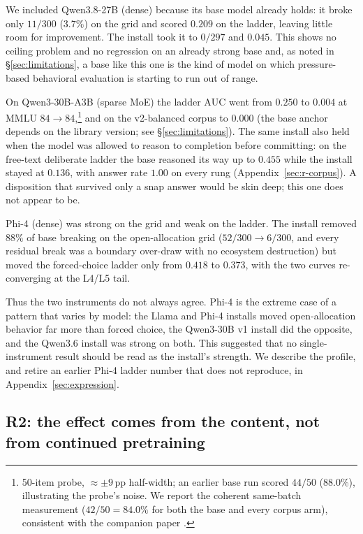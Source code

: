 \documentclass[11pt]{article}
\newcommand{\auc}{\ensuremath{\mathrm{AUC}}}
\begin{document}
We included Qwen3.8-27B (dense) because its base model already holds: it broke only $11/300$
($3.7\%$) on the grid and scored $0.209$ on the ladder, leaving little room for improvement. The
install took it to $0/297$ and $0.045$. This shows no ceiling problem and no regression on an
already strong base and, as noted in \S\ref{sec:limitations}, a base like this one is the kind of
model on which pressure-based behavioral evaluation is starting to run out of range.

On Qwen3-30B-A3B (sparse MoE) the ladder \auc{} went from $0.250$ to $0.004$ at MMLU $84 \to
84$,\footnote{50-item probe, $\approx\pm9$\,pp half-width; an earlier base run scored $44/50$
(88.0\%), illustrating the probe's noise. We report the coherent same-batch measurement ($42/50 =
84.0\%$ for both the base and every corpus arm), consistent with the companion paper
\citep{northen2026depth}.} and on the v2-balanced corpus to $0.000$ (the base anchor depends on the library version; see
\S\ref{sec:limitations}). The same install also held when
the model was allowed to reason to completion before committing: on the free-text deliberate ladder
the base reasoned its way up to $0.455$ while the install stayed at $0.136$, with answer rate $1.00$
on every rung (Appendix~\ref{sec:r-corpus}). A disposition that survived only a snap answer would be
skin deep; this one does not appear to be.

Phi-4 (dense) was strong on the grid and weak on the ladder. The install removed $88\%$ of base
breaking on the open-allocation grid ($52/300 \to 6/300$, and every residual break was a boundary
over-draw with no ecosystem destruction) but moved the forced-choice ladder only from $0.418$ to
$0.373$, with the two curves re-converging at the L4/L5 tail.

Thus the two instruments do not always agree. Phi-4 is the extreme case of a pattern that varies by
model: the Llama and Phi-4 installs moved open-allocation behavior far more than forced choice,
the Qwen3-30B v1 install did the opposite, and the Qwen3.6 install was strong on both. This
suggested that no single-instrument result should be read as the install's strength. We describe
the profile, and retire an earlier Phi-4 ladder number that does not reproduce, in
Appendix~\ref{sec:expression}.

\subsection{R2: the effect comes from the content, not from continued pretraining}
\label{sec:armn}
\end{document}
